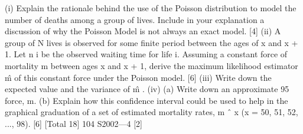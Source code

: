 \documentclass[a4paper,12pt]{article}
\begin{document}
\begin{enumerate}
[Total 8]
(i) Explain the rationale behind the use of the Poisson distribution to model the
number of deaths among a group of lives. Include in your explanation a
discussion of why the Poisson Model is not always an exact model.
[4]
(ii) A group of N lives is observed for some finite period between the ages of x
and x + 1. Let n i be the observed waiting time for life i. Assuming a constant
force of mortality m between ages x and x + 1, derive the maximum likelihood
estimator m̂ of this constant force under the Poisson model.
[6]
(iii) Write down the expected value and the variance of m̂ .
(iv) (a)
Write down an approximate 95%
force, m.
(b)
Explain how this confidence interval could be used to help in the
graphical graduation of a set of estimated mortality rates, m ˆ x (x = 50,
51, 52, ..., 98).
[6]
[Total 18]
104 S2002—4
[2]




\end{enumerate}
\end{document}
